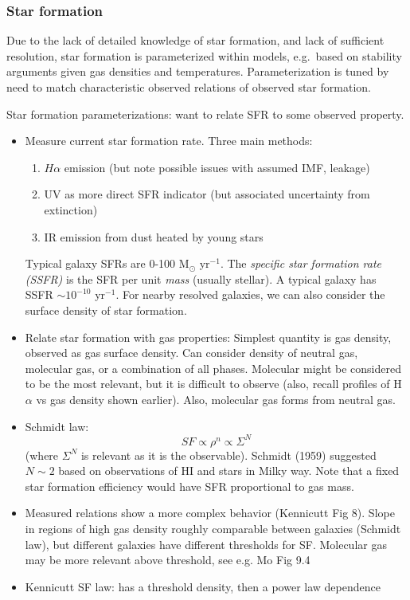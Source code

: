 \documentclass{article}
\begin{document}
\subsubsection{Star formation}
Due to the lack of detailed knowledge of star formation, and lack of sufficient
resolution, star formation is parameterized within models, e.g.\ based on
stability arguments given gas densities and temperatures. Parameterization
is tuned by need to match characteristic observed relations of observed star
formation.

Star formation parameterizations: want to relate SFR to
some observed property.
\begin{itemize}
    \item Measure current star formation rate. Three main methods:
        \begin{enumerate}
            \item $H\alpha$ emission (but note possible issues with assumed
                IMF, leakage)
            \item UV as more direct SFR indicator (but associated
                uncertainty from extinction)
            \item IR emission from dust heated by young stars
        \end{enumerate}
        Typical galaxy SFRs are 0-100 M$_{\odot}$ yr$^{-1}$.
        The \textit{specific star formation rate (SSFR)} is
        the SFR per unit \textit{mass} (usually stellar).
        A typical galaxy has SSFR $\sim 10^{-10}$ yr$^{-1}$.
        For nearby resolved galaxies, we can
        also consider the surface density of star formation.
    \item Relate star formation with gas properties: Simplest quantity is
        gas density, observed as gas surface density. Can consider density
        of neutral gas, molecular gas, or a combination of all phases.
        Molecular might be considered to be the most relevant, but it is
        difficult to observe (also, recall profiles of H$\alpha$ vs gas
        density shown earlier).  Also, molecular gas forms from neutral
        gas.
    \item Schmidt law:
        \[
            SF \propto \rho^{n} \propto \Sigma^{N}
            \]
        (where $\Sigma^{N}$ is relevant as it is the observable).  Schmidt
        (1959) suggested $N \sim 2$ based on observations of HI and stars
        in Milky way. Note that a fixed star formation efficiency would
        have SFR proportional to gas mass.
    \item Measured relations show a more complex behavior (Kennicutt Fig
        8). Slope in regions of high gas density roughly comparable between
        galaxies (Schmidt law), but different galaxies have different
        thresholds for SF. Molecular gas may be more relevant above
        threshold, see e.g. Mo Fig 9.4
    \item Kennicutt SF law: has a threshold density, then a power law
        dependence
\end{itemize}
\end{document}
